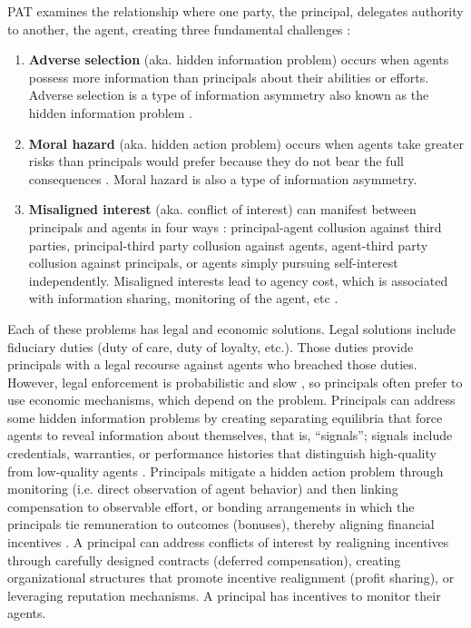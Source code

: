 \documentclass[11pt]{article}
\begin{document}
PAT examines the relationship where one party, the principal, delegates authority to another, the agent, creating three fundamental challenges \citep{eisenhardt_agency_1989,laffont_theory_2002}:
\begin{enumerate}[wide, labelindent=0pt, itemsep=-1pt, topsep=1pt]
    \item[\textbullet] \textbf{Adverse selection} (aka. hidden information problem) occurs when agents possess more information than principals about their abilities or efforts.  Adverse selection is a type of information asymmetry also known as the hidden information problem \citep{akerlof1970market}.
    \item[\textbullet] \textbf{Moral hazard} (aka. hidden action problem) occurs when agents take greater risks than principals would prefer because they do not bear the full consequences \citep{arrow1963uncertainty}. Moral hazard is also a type of information asymmetry.
    \item[\textbullet] \textbf{Misaligned interest} (aka. conflict of interest) can manifest between principals and agents in four ways \citep{jensen_theory_1976}: principal-agent collusion against third parties, principal-third party collusion against agents, agent-third party collusion against principals, or agents simply pursuing self-interest independently.  Misaligned interests lead to agency cost, which is associated with information sharing, monitoring of the agent, etc \citep{fama_agency_1983}. 
\end{enumerate}

Each of these problems has legal and economic solutions.  Legal solutions include fiduciary duties (duty of care, duty of loyalty, etc.). Those duties provide principals with a legal recourse against agents who breached those duties.  However, legal enforcement is probabilistic and slow \citep{levmore1990probabilistic}, so principals often prefer to use economic mechanisms, which depend on the problem.  Principals can address some hidden information problems by creating separating equilibria that force agents to reveal information about themselves, that is, ``signals''; signals include credentials, warranties, or performance histories that distinguish high-quality from low-quality agents \citep{spence1973job}.  Principals mitigate a hidden action problem through monitoring (i.e. direct observation of agent behavior) and then linking compensation to observable effort, or bonding arrangements in which the principals tie remuneration to outcomes (bonuses), thereby aligning financial incentives \citep{holmstrom1979moral}.  A principal can address conflicts of interest by realigning incentives through carefully designed contracts (deferred compensation), creating organizational structures that promote incentive realignment (profit sharing), or leveraging reputation mechanisms. A principal has incentives to monitor their agents.
\end{document}
